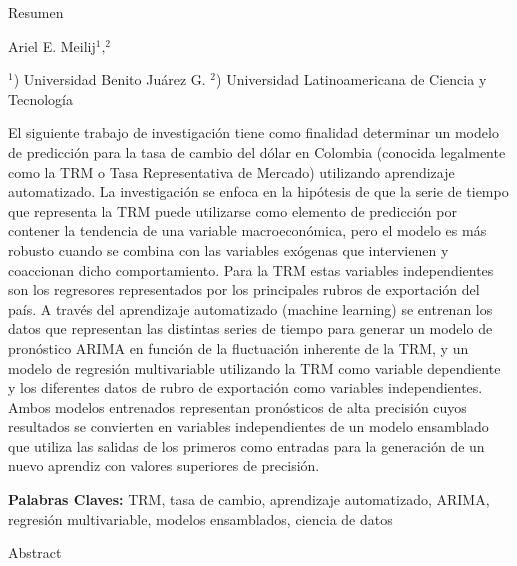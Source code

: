 
\Large
 \begin{center}
Resumen\\ 
\hspace{5pt}

\large
Ariel E. Meilij$^1,^2$  \\
\hspace{5pt}

\small  
$^1$) Universidad Benito Juárez G.
$^2$) Universidad Latinoamericana de Ciencia y Tecnología
\end{center}
\hspace{5pt}

\normalsize
El siguiente trabajo de investigación tiene como finalidad determinar un modelo de predicción para la tasa de cambio del dólar en Colombia (conocida legalmente como la TRM o Tasa Representativa de Mercado) utilizando aprendizaje automatizado. La investigación se enfoca en la hipótesis de que la serie de tiempo que representa la TRM puede utilizarse como elemento de predicción por contener la tendencia de una variable macroeconómica, pero el modelo es más robusto cuando se combina con las variables exógenas que intervienen y coaccionan dicho comportamiento. Para la TRM estas variables independientes son los regresores representados por los principales rubros de exportación del país. A través del aprendizaje automatizado (machine learning) se entrenan los datos que representan las distintas series de tiempo para generar un modelo de pronóstico ARIMA en función de la fluctuación inherente de la TRM, y un modelo de regresión multivariable utilizando la TRM como variable dependiente y los diferentes datos de rubro de exportación como variables independientes. Ambos modelos entrenados representan pronósticos de alta precisión cuyos resultados se convierten en variables independientes de un modelo ensamblado que utiliza las salidas de los primeros como entradas para la generación de un nuevo aprendiz con valores superiores de precisión. 

\textbf{Palabras Claves:} TRM, tasa de cambio, aprendizaje automatizado, ARIMA, regresión multivariable, modelos ensamblados, ciencia de datos


\hspace{10pt}

\Large
 \begin{center}
Abstract\\ 
\hspace{5pt}
\end{center}

